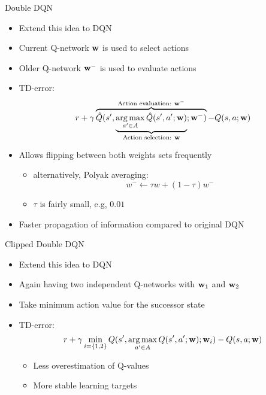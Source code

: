 \documentclass[aspectratio=169]{../latex_main/tntbeamer}  %
\begin{document}
\begin{frame}[c]{Double DQN~}
	
	\begin{itemize}
		\item Extend this idea to DQN
		\item Current Q-network $\mathbf{w}$ is used to select actions 
		\item Older Q-network $\mathbf{w}^-$ is used to evaluate actions
		\item TD-error:
		$$r + \gamma \overbrace{\hat{Q}(s', \underbrace{\operatorname*{arg\,max}_{a' \in A} \hat{Q}(s',a';\mathbf{w})}_{\text{Action selection: }\mathbf{w}};\mathbf{w}^-)}^{\text{Action evaluation: }\mathbf{w}^-} - Q(s,a;\mathbf{w})$$
		
		\pause
		\item Allows flipping between both weights sets frequently 
		\begin{itemize}
			\item alternatively, Polyak averaging:
					$$ w^- \gets \tau w + (1 - \tau)w^- $$
			\item $\tau$ is fairly small, e.g, $0.01$
		\end{itemize}
		\item Faster propagation of information compared to original DQN
	\end{itemize}
	
\end{frame}
\begin{frame}[c]{Clipped Double DQN~}
	
	\begin{itemize}
		\item Extend this idea to DQN
		\item Again having two independent Q-networks with $\mathbf{w}_1$ and $\mathbf{w}_2$
		\item Take minimum action value for the successor state
		\item TD-error:
		$$r + \gamma \min_{i=\{1,2\}}Q(s', \operatorname*{arg\,max}_{a' \in A} Q(s', a'; \mathbf{w}); \mathbf{w}_i) - Q(s,a;\mathbf{w})$$
		\begin{itemize}
		\item Less overestimation of Q-values
		\item More stable learning targets
		\end{itemize}
	\end{itemize}
\end{frame}
\end{document}
